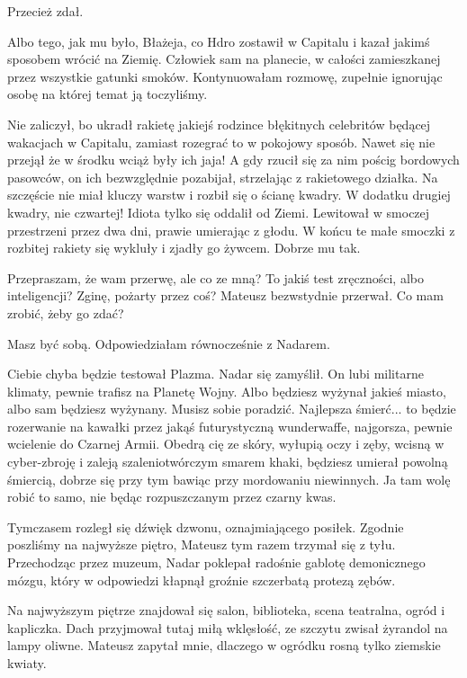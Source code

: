 \ds{} Przecież zdał. \de{}

\ds{} Albo tego, jak mu było, Błażeja, co Hdro zostawił w Capitalu i kazał jakimś sposobem wrócić na Ziemię.
Człowiek sam na planecie, w całości zamieszkanej przez wszystkie gatunki smoków. 
\dm{} Kontynuowałam rozmowę, zupełnie ignorując osobę na której temat ją toczyliśmy. \de{}

\ds{} Nie zaliczył, bo ukradł rakietę jakiejś rodzince błękitnych celebritów będącej wakacjach w Capitalu, zamiast rozegrać to w pokojowy sposób. Nawet się nie przejął że w środku wciąż były ich jaja!
A gdy rzucił się za nim pościg bordowych pasowców, on ich bezwzględnie pozabijał, strzelając z rakietowego działka.
Na szczęście nie miał kluczy warstw i rozbił się o ścianę kwadry. W dodatku drugiej kwadry, nie czwartej! Idiota tylko się oddalił od Ziemi.
Lewitował w smoczej przestrzeni przez dwa dni, prawie umierając z głodu. W końcu te małe smoczki z rozbitej rakiety się wykluły i zjadły go żywcem.
Dobrze mu tak. \de{}

\ds{} Przepraszam, że wam przerwę, ale co ze mną? To jakiś test zręczności, albo inteligencji? Zginę, pożarty przez coś? \dm{} Mateusz bezwstydnie przerwał. \dm{} Co mam zrobić, żeby go zdać? \de{}

\ds{} Masz być sobą. \dm{} Odpowiedziałam równocześnie z Nadarem. \de{}

\ds{} Ciebie chyba będzie testował Plazma. \dm{} Nadar się zamyślił. \dm{} On lubi militarne klimaty, pewnie trafisz na Planetę Wojny.
Albo będziesz wyżynał jakieś miasto, albo sam będziesz wyżynany. Musisz sobie poradzić. 
Najlepsza śmierć... to będzie rozerwanie na kawałki przez jakąś futurystyczną wunderwaffe, najgorsza, pewnie wcielenie do Czarnej Armii.
Obedrą cię ze skóry, wyłupią oczy i zęby, wcisną w cyber-zbroję i zaleją szaleniotwórczym smarem khaki, będziesz umierał powolną śmiercią, dobrze się przy tym bawiąc przy mordowaniu niewinnych. Ja tam wolę robić to samo, nie będąc rozpuszczanym przez czarny kwas.
\de{}

Tymczasem rozległ się dźwięk dzwonu, oznajmiającego posiłek.
Zgodnie poszliśmy na najwyższe piętro, Mateusz tym razem trzymał się z tyłu.
Przechodząc przez muzeum, Nadar poklepał radośnie gablotę demonicznego mózgu, który w odpowiedzi kłapnął groźnie szczerbatą protezą zębów.

Na najwyższym piętrze znajdował się salon, biblioteka, scena teatralna, ogród i kapliczka.
Dach przyjmował tutaj miłą wklęsłość, ze szczytu zwisał żyrandol na lampy oliwne.
Mateusz zapytał mnie, dlaczego w ogródku rosną tylko ziemskie kwiaty.

